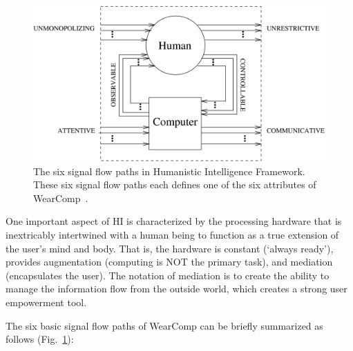 \begin{figure}[htb]
\center
 \includegraphics[width=6.0in]{ch1/figures/Humanistic_intelligence_wearcompdef_multichannel6only.png}
 \caption{The six signal flow paths in Humanistic Intelligence Framework. These six signal flow paths 
each defines one of the six attributes of WearComp~\cite{mann2001wearable}.}
 \label{fig:hiflow}
\end{figure}

One important aspect of HI is characterized by the processing hardware that is inextricably intertwined 
with a human being to function as a true extension of the user's mind and body. That is, the hardware 
is constant (`always ready'), provides augmentation (computing is NOT the primary task), and 
mediation (encapsulates the user). The notation of mediation is to create the ability to manage the 
information flow from the outside world, which creates a strong user empowerment tool.

The six basic signal flow paths of WearComp can be briefly summarized as follows 
(Fig.~\ref{fig:hiflow}): 

